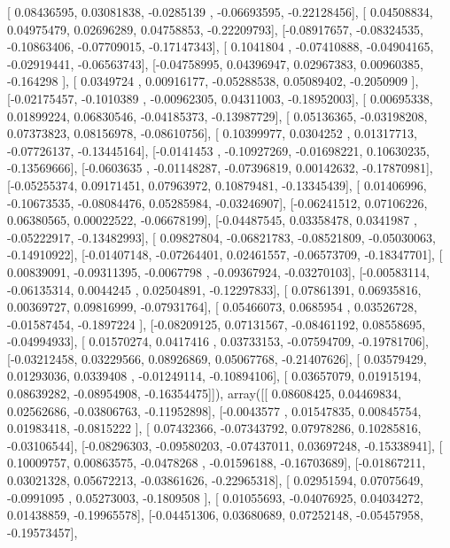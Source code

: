 \documentclass{article}
\begin{document}
       [ 0.08436595,  0.03081838, -0.0285139 , -0.06693595, -0.22128456],
       [ 0.04508834,  0.04975479,  0.02696289,  0.04758853, -0.22209793],
       [-0.08917657, -0.08324535, -0.10863406, -0.07709015, -0.17147343],
       [ 0.1041804 , -0.07410888, -0.04904165, -0.02919441, -0.06563743],
       [-0.04758995,  0.04396947,  0.02967383,  0.00960385, -0.164298  ],
       [ 0.0349724 ,  0.00916177, -0.05288538,  0.05089402, -0.2050909 ],
       [-0.02175457, -0.1010389 , -0.00962305,  0.04311003, -0.18952003],
       [ 0.00695338,  0.01899224,  0.06830546, -0.04185373, -0.13987729],
       [ 0.05136365, -0.03198208,  0.07373823,  0.08156978, -0.08610756],
       [ 0.10399977,  0.0304252 ,  0.01317713, -0.07726137, -0.13445164],
       [-0.0141453 , -0.10927269, -0.01698221,  0.10630235, -0.13569666],
       [-0.0603635 , -0.01148287, -0.07396819,  0.00142632, -0.17870981],
       [-0.05255374,  0.09171451,  0.07963972,  0.10879481, -0.13345439],
       [ 0.01406996, -0.10673535, -0.08084476,  0.05285984, -0.03246907],
       [-0.06241512,  0.07106226,  0.06380565,  0.00022522, -0.06678199],
       [-0.04487545,  0.03358478,  0.0341987 , -0.05222917, -0.13482993],
       [ 0.09827804, -0.06821783, -0.08521809, -0.05030063, -0.14910922],
       [-0.01407148, -0.07264401,  0.02461557, -0.06573709, -0.18347701],
       [ 0.00839091, -0.09311395, -0.0067798 , -0.09367924, -0.03270103],
       [-0.00583114, -0.06135314,  0.0044245 ,  0.02504891, -0.12297833],
       [ 0.07861391,  0.06935816,  0.00369727,  0.09816999, -0.07931764],
       [ 0.05466073,  0.0685954 ,  0.03526728, -0.01587454, -0.1897224 ],
       [-0.08209125,  0.07131567, -0.08461192,  0.08558695, -0.04994933],
       [ 0.01570274,  0.0417416 ,  0.03733153, -0.07594709, -0.19781706],
       [-0.03212458,  0.03229566,  0.08926869,  0.05067768, -0.21407626],
       [ 0.03579429,  0.01293036,  0.0339408 , -0.01249114, -0.10894106],
       [ 0.03657079,  0.01915194,  0.08639282, -0.08954908, -0.16354475]]), array([[ 0.08608425,  0.04469834,  0.02562686, -0.03806763, -0.11952898],
       [-0.0043577 ,  0.01547835,  0.00845754,  0.01983418, -0.0815222 ],
       [ 0.07432366, -0.07343792,  0.07978286,  0.10285816, -0.03106544],
       [-0.08296303, -0.09580203, -0.07437011,  0.03697248, -0.15338941],
       [ 0.10009757,  0.00863575, -0.0478268 , -0.01596188, -0.16703689],
       [-0.01867211,  0.03021328,  0.05672213, -0.03861626, -0.22965318],
       [ 0.02951594,  0.07075649, -0.0991095 ,  0.05273003, -0.1809508 ],
       [ 0.01055693, -0.04076925,  0.04034272,  0.01438859, -0.19965578],
       [-0.04451306,  0.03680689,  0.07252148, -0.05457958, -0.19573457],
\end{document}
